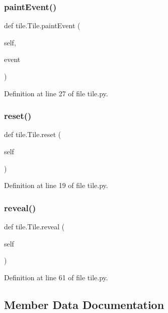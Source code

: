 \subsubsection{\texorpdfstring{paintEvent()}{paintEvent()}}
{\footnotesize\ttfamily def tile.\+Tile.\+paint\+Event (\begin{DoxyParamCaption}\item[{}]{self,  }\item[{}]{event }\end{DoxyParamCaption})}



Definition at line 27 of file tile.\+py.

\mbox{\label{classtile_1_1_tile_aace6248933849675e14c829240fcc4c2}} 
\subsubsection{\texorpdfstring{reset()}{reset()}}
{\footnotesize\ttfamily def tile.\+Tile.\+reset (\begin{DoxyParamCaption}\item[{}]{self }\end{DoxyParamCaption})}



Definition at line 19 of file tile.\+py.

\mbox{\label{classtile_1_1_tile_a446f045f44718e6837abae8d0622c8ca}} 
\subsubsection{\texorpdfstring{reveal()}{reveal()}}
{\footnotesize\ttfamily def tile.\+Tile.\+reveal (\begin{DoxyParamCaption}\item[{}]{self }\end{DoxyParamCaption})}



Definition at line 61 of file tile.\+py.



\subsection{Member Data Documentation}
\mbox{\label{classtile_1_1_tile_a5f38c273f7d60000a57a75be5021e111}} 
